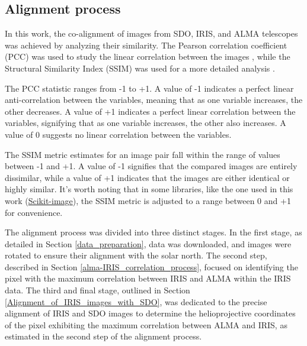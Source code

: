 \documentclass[a4paper,alpha-refs]{eSpectra}
\begin{document}


\subsection{Alignment process} \label{chap_2:seccion_2.3}


In this work, the co-alignment of images from SDO, IRIS, and ALMA telescopes was achieved by analyzing their similarity. The Pearson correlation coefficient (PCC) was used to study the linear correlation between the images \cite{yeager_libguides_nodate}, while the Structural Similarity Index (SSIM) was used for a more detailed analysis \cite{wang_image_2004_SSIM}. 

The PCC statistic ranges from -1 to +1. A value of -1 indicates a perfect linear anti-correlation between the variables, meaning that as one variable increases, the other decreases. A value of +1 indicates a perfect linear correlation between the variables, signifying that as one variable increases, the other also increases. A value of 0 suggests no linear correlation between the variables.

The SSIM metric estimates for an image pair fall within the range of values between -1 and +1. A value of -1 signifies that the compared images are entirely dissimilar, while a value of +1 indicates that the images are either identical or highly similar. It's worth noting that in some libraries, like the one used in this work (\href{https://scikit-image.org/docs/stable/auto_examples/transform/plot_ssim.html}{Scikit-image}), the SSIM metric is adjusted to a range between 0 and +1 for convenience.


The alignment process was divided into three distinct stages. In the first stage,  as detailed in Section \ref{data_preparation}, data was downloaded, and images were rotated to ensure their alignment with the solar north. 
The second step, described in Section \ref{alma-IRIS_correlation_process}, focused on identifying the pixel with the maximum correlation between IRIS and ALMA within the IRIS data. The third and final stage, outlined in Section \ref{Alignment_of_IRIS_images_with_SDO}, was dedicated to the precise alignment of IRIS and SDO images to determine the helioprojective coordinates of the pixel exhibiting the maximum correlation between ALMA and IRIS, as estimated in the second step of the alignment process.
\end{document}
